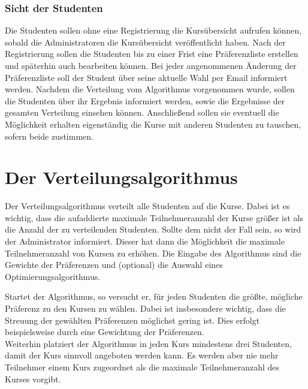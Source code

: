             
                
            \subsubsection{Sicht der Studenten}
                Die Studenten sollen ohne eine Registrierung die Kursübersicht aufrufen können, sobald die Administratoren die Kursübersicht veröffentlicht haben.
                Nach der Registrierung sollen die Studenten bis zu einer Frist eine Präferenzliste erstellen und späterhin auch bearbeiten können.
                Bei jeder angenommenen Änderung der Präferenzliste soll der Student über seine aktuelle Wahl per Email informiert werden.
                Nachdem die Verteilung vom Algorithmus vorgenommen wurde, sollen die Studenten über ihr Ergebnis informiert werden, sowie die Ergebnisse der gesamten Verteilung einsehen können.
                Anschließend sollen sie eventuell die Möglichkeit erhalten eigenständig die Kurse mit anderen Studenten zu tauschen, sofern beide zustimmen.
    
    
%    
    
            
    
    \section{Der Verteilungsalgorithmus}
        Der Verteilungsalgorithmus verteilt alle Studenten auf die Kurse.
        Dabei ist es wichtig, dass die aufaddierte maximale Teilnehmeranzahl der Kurse größer ist als die Anzahl der zu verteilenden Studenten.
        Sollte dem nicht der Fall sein, so wird der Administrator informiert.
        Dieser hat dann die Möglichkeit die maximale Teilnehmeranzahl von Kursen zu erhöhen.
        Die Eingabe des Algorithmus sind die Gewichte der Präferenzen und (optional) die Auswahl eines Optimierungsalgorithmus.
        
        Startet der Algorithmus, so versucht er, für jeden Studenten die größte, mögliche Präferenz zu den Kursen zu wählen.
        Dabei ist insbesondere wichtig, dass die Streuung der gewählten Präferenzen möglichst gering ist.
        Dies erfolgt beispielsweise durch eine Gewichtung der Präferenzen.\\
        Weiterhin platziert der Algorithmus in jeden Kurs mindestens drei Studenten, damit der Kurs sinnvoll angeboten werden kann.
        Es werden aber nie mehr Teilnehmer einem Kurs zugeordnet als die maximale Teilnehmeranzahl des Kurses vorgibt.
        

